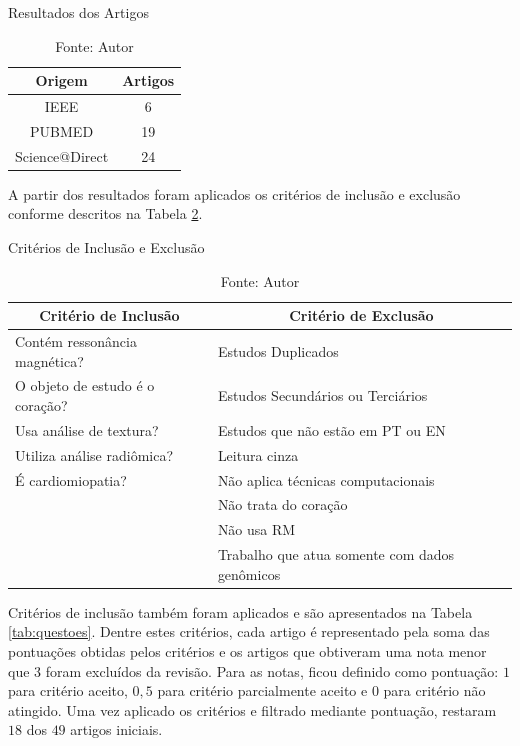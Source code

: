 \begin{table}[hbtp]
    \caption{Resultados dos Artigos}
    \centering
    \renewcommand{\arraystretch}{1.4} %
    \begin{tabular}{|c|c|}
    \hline 
          \textbf{Origem} & \textbf{Artigos}  \\ 
    \hline 
        IEEE & 6 \\ 
        PUBMED & 19 \\ 
        Science@Direct & 24 \\ 
    \hline 
    \end{tabular} 
    \caption*{Fonte: Autor}
    \label{tab:resultado_busca}
\end{table}

A partir dos resultados foram aplicados os critérios de inclusão e exclusão conforme descritos na Tabela \ref{tab:criterios}.

\begin{table}[hbtp]
    \centering
    \caption{Critérios de Inclusão e Exclusão}
    \renewcommand{\arraystretch}{1.4} %
    \begin{tabular}{|l|l|}
    \hline 
          \multicolumn{1}{|c|}{\textbf{Critério de Inclusão}} & \multicolumn{1}{c|}{\textbf{Critério de Exclusão}}  \\ 
    \hline 
        \quad Contém ressonância magnética? & \quad Estudos Duplicados   \\ 
        \quad O objeto de estudo é o coração? & \quad Estudos Secundários ou Terciários \\
        \quad Usa análise de textura? & \quad Estudos que não estão em PT ou EN\\
        \quad Utiliza análise radiômica? & \quad Leitura cinza  \\
        \quad É cardiomiopatia? & \quad Não aplica técnicas computacionais\\
        & \quad Não trata do coração \\
        & \quad Não usa RM \\
        & \quad Trabalho que atua somente com dados genômicos \\ 
    \hline 
    \end{tabular} 
    \caption*{Fonte: Autor}
    \label{tab:criterios}
\end{table}

Critérios de inclusão também foram aplicados e são apresentados na Tabela \ref{tab:questoes}. Dentre estes critérios, cada artigo é representado pela soma das pontuações obtidas pelos critérios e os artigos que obtiveram uma nota menor que 3 foram excluídos da revisão. Para as notas, ficou definido como pontuação: $1$ para critério aceito, $0,5$ para critério parcialmente aceito e $0$ para critério não atingido. Uma vez aplicado os critérios e filtrado mediante pontuação, restaram $18$ dos $49$ artigos iniciais.



